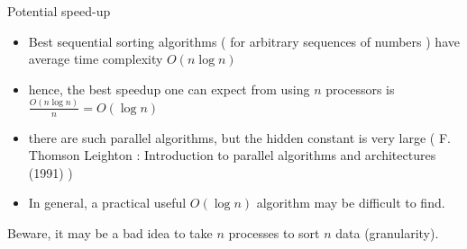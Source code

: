 \documentclass[compress,10pt,aspectratio=169]{beamer}
\begin{document}
\begin{frame}[fragile]{Potential speed-up}
\begin{multicols}{2}
\begin{center}
\end{center}

\begin{itemize}
\item Best sequential sorting algorithms ( for arbitrary sequences of numbers )
  have average time complexity $O(n\log n)$
\item hence, the best speedup one can expect from using $n$ processors is
$
\frac{O\left(n\log n\right)}{n} = O(\log n)
$
\item there are such parallel algorithms, but the hidden constant is very large ( F. Thomson Leighton : Introduction to parallel algorithms and architectures (1991) )
\item In general, a practical useful $O(\log n)$ algorithm may be difficult to find.
\end{itemize}
\end{multicols}

\alert{Beware}, it may be a bad idea to take $n$ processes to sort $n$ data (granularity).
\end{frame}
\end{document}
